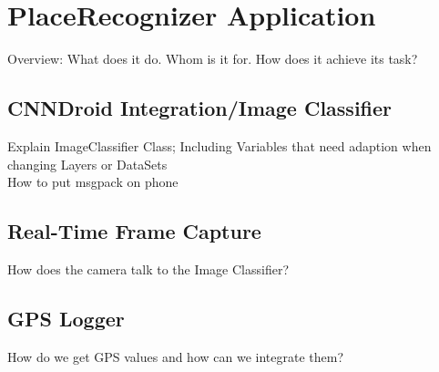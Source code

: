 \section {PlaceRecognizer Application}
Overview: What does it do. Whom is it for. How does it achieve its task?

\subsection {CNNDroid Integration/Image Classifier}
Explain ImageClassifier Class; Including Variables that need adaption when changing Layers or DataSets\\
How to put msgpack on phone

\subsection {Real-Time Frame Capture}
How does the camera talk to the Image Classifier?

\subsection {GPS Logger}
How do we get GPS values and how can we integrate them?

